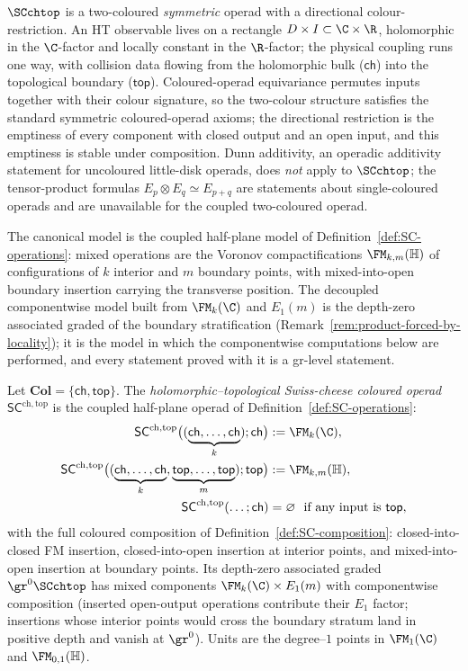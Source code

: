 $\SCchtop$ is a two-coloured \emph{symmetric} operad with a
directional colour-restriction. An HT
observable lives on a rectangle $D \times I \subset \C \times \R$,
holomorphic in the $\C$-factor and locally constant in the
$\R$-factor; the physical coupling runs one way, with collision data
flowing from the holomorphic bulk ($\mathsf{ch}$) into the
topological boundary ($\mathsf{top}$). Coloured-operad equivariance
permutes inputs together with their colour signature, so the
two-colour structure satisfies the standard symmetric coloured-operad
axioms; the directional restriction is the emptiness of every
component with closed output and an open input, and this emptiness
is stable under composition. Dunn additivity, an operadic
additivity statement for uncoloured little-disk operads,
does \emph{not} apply to $\SCchtop$; the tensor-product formulas
$E_p \otimes E_q \simeq E_{p+q}$ are statements about
single-coloured operads and are unavailable for the coupled
two-coloured operad.

The canonical model is the coupled half-plane model of
Definition~\ref{def:SC-operations}: mixed operations are the
Voronov compactifications $\FM_{k,m}(\mathbb H)$ of configurations
of $k$ interior and $m$ boundary points, with mixed-into-open
boundary insertion carrying the transverse position. The decoupled
componentwise model built from $\FM_k(\C)$ and $E_1(m)$ is the
depth-zero associated graded of the boundary stratification
(Remark~\ref{rem:product-forced-by-locality}); it is the model in
which the componentwise computations below are performed, and every
statement proved with it is a gr-level statement.

\begin{definition}
\label{def:SC}
Let $\mathbf{Col}=\{\mathsf{ch},\mathsf{top}\}$. The
\emph{holomorphic--topological Swiss-cheese coloured operad}
$\mathsf{SC}^{\mathrm{ch,top}}$ is the coupled half-plane operad of
Definition~\ref{def:SC-operations}:
\begin{align*}
\mathsf{SC}^{\mathrm{ch,top}}\bigl((\underbrace{\mathsf{ch},\dots,\mathsf{ch}}_{k});\mathsf{ch}\bigr) &:= \FM_k(\C),\\
\mathsf{SC}^{\mathrm{ch,top}}\bigl((\underbrace{\mathsf{ch},\dots,\mathsf{ch}}_{k},\underbrace{\mathsf{top},\dots,\mathsf{top}}_{m});\mathsf{top}\bigr) &:= \FM_{k,m}(\mathbb H),\\
\mathsf{SC}^{\mathrm{ch,top}}(\ldots;\mathsf{ch}) &= \varnothing \ \text{ if any input is $\mathsf{top}$},
\end{align*}
with the full coloured composition of
Definition~\ref{def:SC-composition}: closed-into-closed FM
insertion, closed-into-open insertion at interior points, and
mixed-into-open insertion at boundary points. Its depth-zero
associated graded $\gr^0\SCchtop$ has mixed components
$\FM_k(\C)\times E_1(m)$ with componentwise composition (inserted
open-output operations contribute their $E_1$ factor; insertions
whose interior points would cross the boundary stratum land in
positive depth and vanish at $\gr^0$). Units are the degree--$1$
points in $\FM_1(\C)$ and $\FM_{0,1}(\mathbb H)$.
\end{definition}

